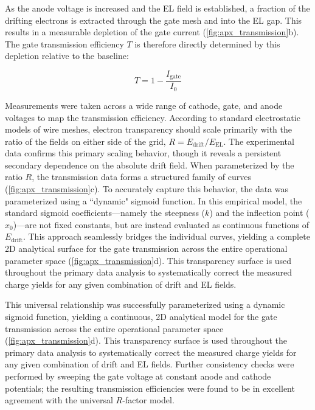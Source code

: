 As the anode voltage is increased and the EL field is established, a fraction of the drifting
electrons is extracted through the gate mesh and into the EL gap. This results in a measurable
depletion of the gate current (\ref{fig:apx_transmission}b). The gate transmission efficiency $T$
is therefore directly determined by this depletion relative to the baseline:

$$T = 1 - \frac{I_{\text{gate}}}{I_{0}}$$

Measurements were taken across a wide range of cathode, gate, and anode voltages to map the
transmission efficiency. According to standard electrostatic models of wire meshes, electron
transparency should scale primarily with the ratio of the fields on either side of the grid, $R =
E_{\text{drift}} / E_{\text{EL}}$. The experimental data confirms this primary scaling behavior,
though it reveals a persistent secondary dependence on the absolute drift field. When parameterized
by the ratio $R$, the transmission data forms a structured family of curves
(\ref{fig:apx_transmission}c). To accurately capture this behavior, the data was parameterized
using a ``dynamic" sigmoid function. In this empirical model, the standard sigmoid
coefficients—namely the steepness ($k$) and the inflection point ($x_0$)—are not fixed constants,
but are instead evaluated as continuous functions of $E_{\text{drift}}$. This approach seamlessly
bridges the individual curves, yielding a complete 2D analytical surface for the gate transmission
across the entire operational parameter space (\ref{fig:apx_transmission}d). This transparency
surface is used throughout the primary data analysis to systematically correct the measured charge
yields for any given combination of drift and EL fields.

This universal relationship was successfully parameterized using a dynamic sigmoid function,
yielding a continuous, 2D analytical model for the gate transmission across the entire operational
parameter space (\ref{fig:apx_transmission}d). This transparency surface is used throughout the
primary data analysis to systematically correct the measured charge yields for any given
combination of drift and EL fields. Further consistency checks were performed by sweeping the gate
voltage at constant anode and cathode potentials; the resulting transmission efficiencies were
found to be in excellent agreement with the universal $R$-factor model.

